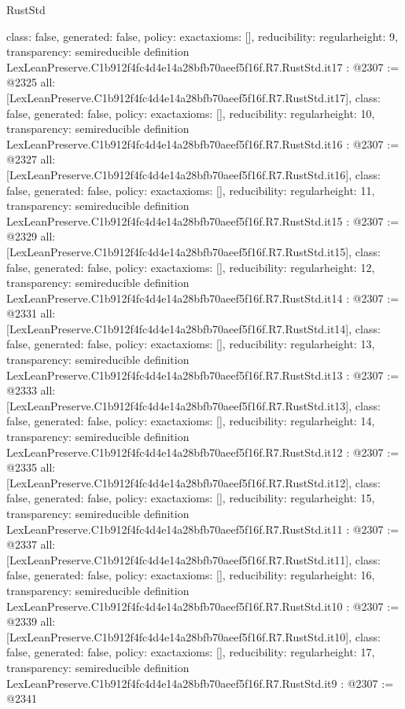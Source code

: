 \begin{lexlean}{RustStd}
\begin{coremodule}
{  class: false,
  generated: false,
  policy: exact{axioms: []},
  reducibility: regular{height: 9},
  transparency: semireducible
}
definition LexLeanPreserve.C1b912f4fc4d4e14a28bfb70aeef5f16f.R7.RustStd.it17 : @2307 := @2325 {
  all: [LexLeanPreserve.C1b912f4fc4d4e14a28bfb70aeef5f16f.R7.RustStd.it17],
  class: false,
  generated: false,
  policy: exact{axioms: []},
  reducibility: regular{height: 10},
  transparency: semireducible
}
definition LexLeanPreserve.C1b912f4fc4d4e14a28bfb70aeef5f16f.R7.RustStd.it16 : @2307 := @2327 {
  all: [LexLeanPreserve.C1b912f4fc4d4e14a28bfb70aeef5f16f.R7.RustStd.it16],
  class: false,
  generated: false,
  policy: exact{axioms: []},
  reducibility: regular{height: 11},
  transparency: semireducible
}
definition LexLeanPreserve.C1b912f4fc4d4e14a28bfb70aeef5f16f.R7.RustStd.it15 : @2307 := @2329 {
  all: [LexLeanPreserve.C1b912f4fc4d4e14a28bfb70aeef5f16f.R7.RustStd.it15],
  class: false,
  generated: false,
  policy: exact{axioms: []},
  reducibility: regular{height: 12},
  transparency: semireducible
}
definition LexLeanPreserve.C1b912f4fc4d4e14a28bfb70aeef5f16f.R7.RustStd.it14 : @2307 := @2331 {
  all: [LexLeanPreserve.C1b912f4fc4d4e14a28bfb70aeef5f16f.R7.RustStd.it14],
  class: false,
  generated: false,
  policy: exact{axioms: []},
  reducibility: regular{height: 13},
  transparency: semireducible
}
definition LexLeanPreserve.C1b912f4fc4d4e14a28bfb70aeef5f16f.R7.RustStd.it13 : @2307 := @2333 {
  all: [LexLeanPreserve.C1b912f4fc4d4e14a28bfb70aeef5f16f.R7.RustStd.it13],
  class: false,
  generated: false,
  policy: exact{axioms: []},
  reducibility: regular{height: 14},
  transparency: semireducible
}
definition LexLeanPreserve.C1b912f4fc4d4e14a28bfb70aeef5f16f.R7.RustStd.it12 : @2307 := @2335 {
  all: [LexLeanPreserve.C1b912f4fc4d4e14a28bfb70aeef5f16f.R7.RustStd.it12],
  class: false,
  generated: false,
  policy: exact{axioms: []},
  reducibility: regular{height: 15},
  transparency: semireducible
}
definition LexLeanPreserve.C1b912f4fc4d4e14a28bfb70aeef5f16f.R7.RustStd.it11 : @2307 := @2337 {
  all: [LexLeanPreserve.C1b912f4fc4d4e14a28bfb70aeef5f16f.R7.RustStd.it11],
  class: false,
  generated: false,
  policy: exact{axioms: []},
  reducibility: regular{height: 16},
  transparency: semireducible
}
definition LexLeanPreserve.C1b912f4fc4d4e14a28bfb70aeef5f16f.R7.RustStd.it10 : @2307 := @2339 {
  all: [LexLeanPreserve.C1b912f4fc4d4e14a28bfb70aeef5f16f.R7.RustStd.it10],
  class: false,
  generated: false,
  policy: exact{axioms: []},
  reducibility: regular{height: 17},
  transparency: semireducible
}
definition LexLeanPreserve.C1b912f4fc4d4e14a28bfb70aeef5f16f.R7.RustStd.it9 : @2307 := @2341 {
}
\end{coremodule}
\end{lexlean}
